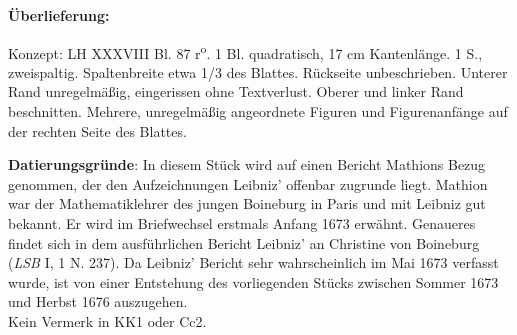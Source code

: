    
        
        \begin{ledgroupsized}[r]{120mm}
        \footnotesize 
        \pstart        
        \noindent\textbf{\"{U}berlieferung:}  
        \pend
        \end{ledgroupsized}
      
       
              \begin{ledgroupsized}[r]{114mm}
              \footnotesize 
              \pstart \parindent -6mm
              Konzept: LH XXXVIII Bl. 87 r\textsuperscript{o}. 1 Bl. quadratisch, 17 cm Kantenl\"{a}nge. 1 S., zweispaltig. Spaltenbreite etwa 1/3 des Blattes. R\"{u}ckseite unbeschrieben. Unterer Rand unregelm\"{a}ßig, eingerissen ohne Textverlust. Oberer und linker Rand beschnitten. Mehrere, unregelm\"{a}ßig angeordnete Figuren und Figurenanf\"{a}nge auf der rechten Seite des Blattes. \pend
              \end{ledgroupsized}
        \vspace*{5mm}
        \begin{ledgroup}
        \footnotesize 
        \pstart
      \noindent\footnotesize{\textbf{Datierungsgr\"{u}nde}: In diesem St\"{u}ck wird auf einen Bericht Mathions Bezug genommen, der den Aufzeichnungen Leibniz' offenbar zugrunde liegt. Mathion war der Mathematiklehrer des jungen Boineburg in Paris und mit Leibniz gut bekannt. Er wird im Briefwechsel erstmals Anfang 1673 erw\"{a}hnt. Genaueres findet sich in dem ausf\"{u}hrlichen Bericht Leibniz' an Christine von Boineburg (\textit{LSB} I, 1 N. 237). Da Leibniz' Bericht sehr wahrscheinlich im Mai 1673 verfasst wurde, ist von einer Entstehung des vorliegenden St\"{u}cks zwischen Sommer 1673 und Herbst 1676 auszugehen.\\Kein Vermerk in KK1 oder Cc2.}
        \pend
        \end{ledgroup}
      
